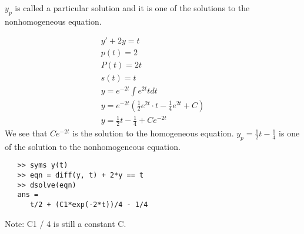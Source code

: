 \(y_p\) is called a particular solution and it is one of the solutions to the nonhomogeneous equation.  
\begin{example}
   \begin{gather*}
  y' + 2y = t \\ 
  p(t) = 2\\ 
  P(t) = 2t\\
  s(t) = t \\
  y = e^{-2t}\int e^{2t} t dt\\
  y = e^{-2t}\left( \frac{1}{2} e^{2t} \cdot t - \frac{1}{4}e^{2t} + C \right)\\
  y = \frac{1}{2} t- \frac{1}{4} + C e^{-2t}
   \end{gather*}
   We see that  \(Ce^{-2t}\) is the solution to the homogeneous equation.
   \(y_p = \frac{1}{2} t- \frac{1}{4}\) is one of the solution to the nonhomogeneous equation. 
\end{example}
\begin{matlab}
  \begin{lstlisting}
   >> syms y(t)
   >> eqn = diff(y, t) + 2*y == t
   >> dsolve(eqn)
   ans =
      t/2 + (C1*exp(-2*t))/4 - 1/4
  \end{lstlisting}
  Note: C1 / 4 is still a constant C.
\end{matlab}